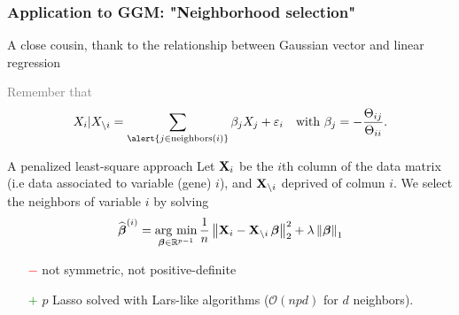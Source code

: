 \begin{frame}
  \frametitle{Application to GGM: "Neighborhood selection"} 

  A close cousin, thank to the relationship between Gaussian vector and linear regression
  
  \textcolor{gray}{
  Remember that
  \begin{equation*}
    X_i | X_{ \setminus i} = \sum_{\alert{j \in \text{neighbors}(i)}} \beta_j X_j + \varepsilon_i
    \quad         \text{with         }         \beta_j         =
    -\frac{\Theta_{ij}}{\Theta_{ii}}.
  \end{equation*}
  }
  
  \begin{block}{A penalized least-square approach}
    Let $\mathbf{X}_i$ be the $i$th column of the data matrix (i.e data associated to variable (gene) $i$), and $\mathbf{X}_{\backslash i}$ deprived of colmun $i$. We select the neighbors of variable $i$ by solving
    \begin{equation*}
      \widehat{\boldsymbol\beta}^{(i)} = \mathop{\mathrm{arg\ min}}_{\boldsymbol\beta \in \mathbb{R}^{p-1} }
      \frac{1}{n} \left\| \mathbf{X}_i - \mathbf{X}_{\backslash i} \,
        {\boldsymbol\beta} \right\|_2^2 + \lambda \left\| {\boldsymbol\beta} \right\|_{1}
    \end{equation*}

    \begin{itemize}
    \item[\textcolor{red}{$-$}] not symmetric, not positive-definite
    \item[\textcolor{green}{$+$}] $p$
      Lasso solved with Lars-like algorithms ($\mathcal{O}(npd)$ for $d$ neighbors).
    \end{itemize}

\end{block}

\end{frame}


